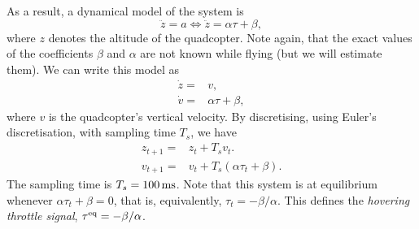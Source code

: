 \documentclass{article}
\begin{document}
  As a result, a dynamical model of the system is
  \begin{equation}
    \ddot{z} {}={} a \Leftrightarrow \ddot{z} {}={} \alpha \tau + \beta,
  \end{equation}
  where $z$ denotes the altitude of the quadcopter.
  Note again, that the exact values of the coefficients $\beta$ and $\alpha$ are not known
  while flying (but we will estimate them). We can write this model as
  \begin{subequations}
    \begin{align}
      \dot{z} {}={} & v,
      \\
      \dot{v} {}={} & \alpha \tau + \beta,
    \end{align}
  \end{subequations}
  where $v$ is the quadcopter's vertical velocity.
  By discretising, using Euler's discretisation, with sampling time $T_s$,
  we have
  \begin{subequations}\label{eq:basic-mdl}
    \begin{align}
      z_{t+1} {}={} & z_t + T_s v_t.
      \\
      v_{t+1} {}={} & v_t + T_s(\alpha \tau_t + \beta).
    \end{align}
  \end{subequations}
  The sampling time is $T_s = \unit[100]{ms}$.
  Note that this system is at equilibrium whenever $\alpha \tau_t + \beta = 0$,
  that is, equivalently, $\tau_t = -\beta / \alpha$. This defines the \textit{hovering
    throttle signal}, $\tau^{\rm eq} = -\beta / \alpha$.
  
\end{document}
